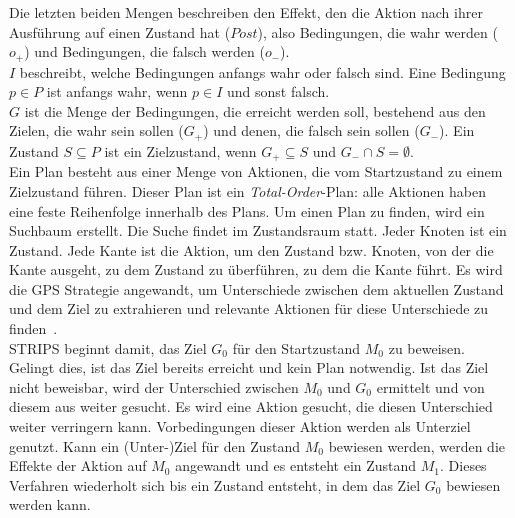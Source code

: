 Die letzten beiden Mengen beschreiben den Effekt, den die Aktion nach ihrer Ausführung auf einen Zustand hat ($Post$), also Bedingungen, die wahr werden ($o_+$) und Bedingungen, die falsch werden ($o_-$).\\
$I$ beschreibt, welche Bedingungen anfangs wahr oder falsch sind.
Eine Bedingung $p\in P$ ist anfangs wahr, wenn $p\in I$ und sonst falsch.\\
$G$ ist die Menge der Bedingungen, die erreicht werden soll, bestehend aus den Zielen, die wahr sein sollen ($G_+$) und denen, die falsch sein sollen ($G_-$).
Ein Zustand $S\subseteq P$  ist ein Zielzustand, wenn $G_+\subseteq S$ und $G_-\cap S =\emptyset$.\\
Ein Plan besteht aus einer Menge von Aktionen, die vom Startzustand zu einem Zielzustand führen.
Dieser Plan ist ein \emph{Total-Order}-Plan: alle Aktionen haben eine feste Reihenfolge innerhalb des Plans.
Um einen Plan zu finden, wird ein Suchbaum erstellt.
Die Suche findet im Zustandsraum statt.
Jeder Knoten ist ein Zustand.
Jede Kante ist die Aktion, um den Zustand bzw. Knoten, von der die Kante ausgeht, zu dem Zustand zu überführen, zu dem die Kante führt.
Es wird die GPS Strategie angewandt, um Unterschiede zwischen dem aktuellen Zustand und dem Ziel zu extrahieren und relevante Aktionen für diese Unterschiede zu finden~\cite{FIKES1971189}.\\
\ac{STRIPS} beginnt damit, das Ziel $G_0$ für den Startzustand $M_0$ zu beweisen.
Gelingt dies, ist das Ziel bereits erreicht und kein Plan notwendig.
Ist das Ziel nicht beweisbar, wird der Unterschied zwischen $M_0$ und $G_0$ ermittelt und von diesem aus weiter gesucht.
Es wird eine Aktion gesucht, die diesen Unterschied weiter verringern kann.
Vorbedingungen dieser Aktion werden als Unterziel genutzt.
Kann ein (Unter-)Ziel für den Zustand $M_0$ bewiesen werden, werden die Effekte der Aktion auf $M_0$ angewandt und es entsteht ein Zustand $M_1$.
Dieses Verfahren wiederholt sich bis ein Zustand entsteht, in dem das Ziel $G_0$ bewiesen werden kann.
